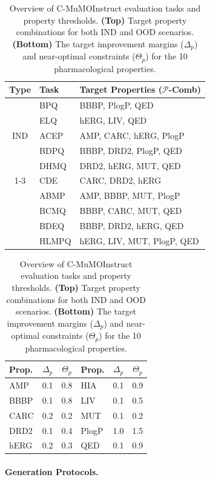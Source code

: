 \documentclass[11pt]{article}
\begin{document}
\begin{table}[h]
\centering
\small
\setlength{\tabcolsep}{4pt}

\begin{tabular}{@{}cll@{}}
\toprule
\textbf{Type} & \textbf{Task} & \textbf{Target Properties ($\mathcal{P}$-Comb)} \\
\midrule
\multirow{5}{*}{IND} 
& BPQ  & BBBP, PlogP, QED \\
& ELQ  & hERG, LIV, QED \\
& ACEP & AMP, CARC, hERG, PlogP \\
& BDPQ & BBBP, DRD2, PlogP, QED \\
& DHMQ & DRD2, hERG, MUT, QED \\
\cmidrule{1-3}
\multirow{5}{*}{OOD} 
& CDE   & CARC, DRD2, hERG \\
& ABMP  & AMP, BBBP, MUT, PlogP \\
& BCMQ  & BBBP, CARC, MUT, QED \\
& BDEQ  & BBBP, DRD2, hERG, QED \\
& HLMPQ & hERG, LIV, MUT, PlogP, QED \\
\bottomrule
\end{tabular}

\vspace{0.3cm}

\begin{tabular}{@{}lcc@{\hspace{0.8cm}}lcc@{}}
\toprule
\textbf{Prop.} & $\Delta_p$ & $\Theta_p$ & \textbf{Prop.} & $\Delta_p$ & $\Theta_p$ \\
\midrule
AMP  & 0.1 & 0.8 & HIA   & 0.1 & 0.9 \\
BBBP & 0.1 & 0.8 & LIV   & 0.1 & 0.5 \\
CARC & 0.2 & 0.2 & MUT   & 0.1 & 0.2 \\
DRD2 & 0.1 & 0.4 & PlogP & 1.0 & 1.5 \\
hERG & 0.2 & 0.3 & QED   & 0.1 & 0.9 \\
\bottomrule
\end{tabular}

\caption{Overview of C-MuMOInstruct evaluation tasks and property thresholds. \textbf{(Top)} Target property combinations for both IND and OOD scenarios. \textbf{(Bottom)} The target improvement margins ($\Delta_p$) and near-optimal constraints ($\Theta_p$) for the 10 pharmacological properties.}
\label{tab:dataset_summary}
\end{table}
\paragraph{Generation Protocols.}
\end{document}
